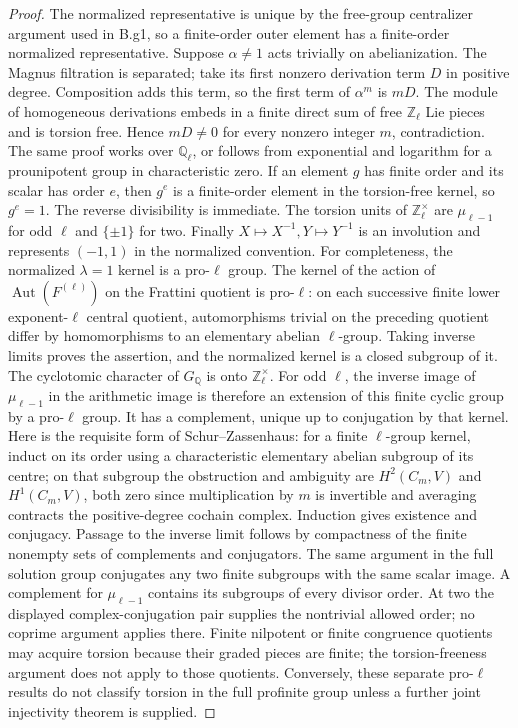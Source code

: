 \begin{proof}
The normalized representative is unique by the free-group centralizer
argument used in B.g1, so a finite-order outer element has a finite-order
normalized representative.  Suppose $\alpha\ne1$ acts trivially on
abelianization.  The Magnus filtration is separated; take its first
nonzero derivation term $D$ in positive degree.  Composition adds this
term, so the first term of $\alpha^m$ is $mD$.
The module of homogeneous derivations embeds in a finite direct sum
of free $\mathbb Z_\ell$ Lie pieces and is torsion free.  Hence
$mD\ne0$ for every nonzero integer $m$, contradiction.
The same proof works over $\mathbb Q_\ell$, or follows from
exponential and logarithm for a prounipotent group in characteristic
zero.
If an element $g$ has finite order and its scalar has order $e$,
then $g^e$ is a finite-order element in the torsion-free kernel, so
$g^e=1$.  The reverse divisibility is immediate.  The torsion units of
$\mathbb Z_\ell^\times$ are $\mu_{\ell-1}$ for odd $\ell$ and
$\{\pm1\}$ for two.  Finally $X\mapsto X^{-1},Y\mapsto Y^{-1}$
is an involution and represents $(-1,1)$ in the normalized convention.
For completeness, the normalized $\lambda=1$ kernel is a pro-$\ell$
group.  The kernel of the action of $\operatorname{Aut}(F^{(\ell)})$
on the Frattini quotient is pro-$\ell$: on each successive finite
lower exponent-$\ell$ central quotient, automorphisms trivial on the
preceding quotient differ by homomorphisms to an elementary abelian
$\ell$-group.  Taking inverse limits proves the assertion, and the
normalized kernel is a closed subgroup of it.
The cyclotomic character of $G_{\mathbb Q}$ is onto
$\mathbb Z_\ell^\times$.  For odd $\ell$, the inverse image of
$\mu_{\ell-1}$ in the arithmetic image is therefore an extension
of this finite cyclic group by a pro-$\ell$ group.
It has a complement, unique up to conjugation by that kernel.
Here is the requisite form of Schur--Zassenhaus: for a finite
$\ell$-group kernel, induct on its order using a characteristic
elementary abelian subgroup of its centre; on that subgroup the
obstruction and ambiguity are $H^2(C_m,V)$ and $H^1(C_m,V)$, both
zero since multiplication by $m$ is invertible and averaging contracts
the positive-degree cochain complex.  Induction gives existence and
conjugacy.  Passage to the inverse limit follows by compactness of
the finite nonempty sets of complements and conjugators.
The same argument in the full solution group conjugates any two
finite subgroups with the same scalar image.  A complement for
$\mu_{\ell-1}$ contains its subgroups of every divisor order.
At two the displayed complex-conjugation pair supplies the nontrivial
allowed order; no coprime argument applies there.
Finite nilpotent or finite congruence quotients may acquire torsion
because their graded pieces are finite; the torsion-freeness argument
does not apply to those quotients.  Conversely, these separate
pro-$\ell$ results do not classify torsion in the full profinite
group unless a further joint injectivity theorem is supplied.
\end{proof}


